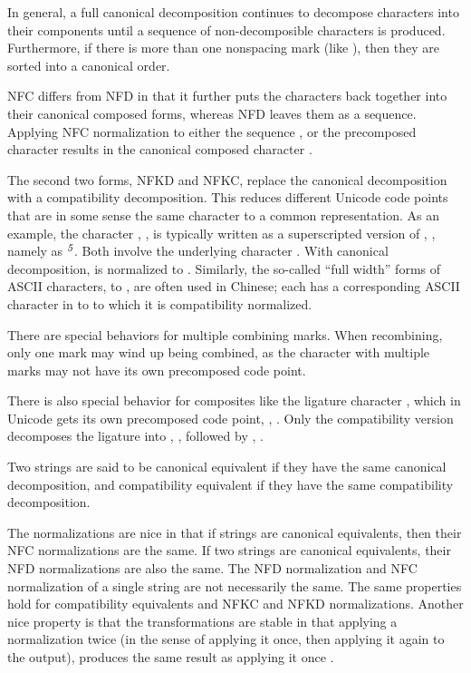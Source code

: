 In general, a full canonical decomposition continues
to decompose characters into their components until a sequence of
non-decomposible characters is produced.  Furthermore, if there is
more than one nonspacing mark (like ), then they are
sorted into a canonical order.

NFC differs from NFD in that it further puts the characters back
together into their canonical composed forms, whereas NFD leaves them
as a sequence.  Applying NFC normalization to either the sequence
,  or the precomposed character
 results in the canonical composed character .

The second two forms, NFKD and NFKC, replace the canonical
decomposition with a compatibility decomposition.  This reduces
different Unicode code points that are in some sense the same
character to a common representation.  As an example, the character
, , is typically written
as a superscripted version of , ,
namely as ${}^{\mbox{\footnotesize{\it 5}}}$.
Both involve the underlying character .  With
canonical decomposition,  is normalized to .
Similarly, the so-called ``full width'' forms of ASCII characters, 
 to , are often used in Chinese; each
has a corresponding ASCII character in  to 
to which it is compatibility normalized.  

There are special behaviors for multiple combining marks.  When
recombining, only one mark may wind up being combined, as the
character with multiple marks may not have its own precomposed code
point.  

There is also special behavior for composites like the ligature
character , which in Unicode gets its own precomposed
code point, , .
Only the compatibility version decomposes the ligature into
, , followed by ,
.

Two strings are said to be canonical equivalent if they have
the same canonical decomposition, and compatibility equivalent
if they have the same compatibility decomposition.  

The normalizations are nice in that if strings are canonical
equivalents, then their NFC normalizations are the same.  If two
strings are canonical equivalents, their NFD normalizations are also
the same.  The NFD normalization and NFC normalization of a single
string are not necessarily the same.  The same properties hold for
compatibility equivalents and NFKC and NFKD normalizations.  Another
nice property is that the transformations are stable in that applying
a normalization twice (in the sense of applying it once, then applying
it again to the output), produces the same result as applying it
once . 

